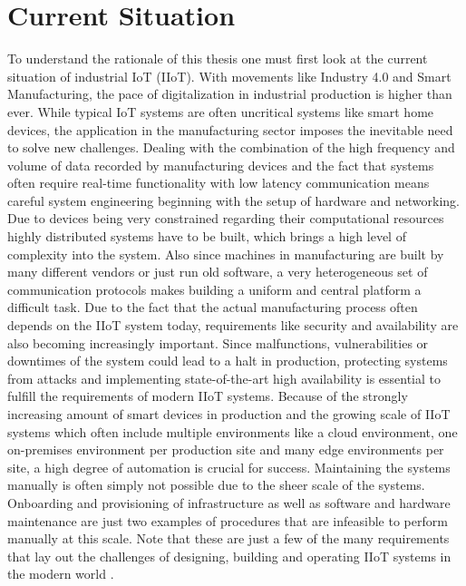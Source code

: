 \section{Current Situation}
\label{section:current-situation}
    To understand the rationale of this thesis one must first look at the current situation of industrial IoT (IIoT). With movements like Industry 4.0 and Smart Manufacturing, the pace of digitalization in industrial production is higher than ever. While typical IoT systems are often uncritical systems like smart home devices, the application in the manufacturing sector imposes the inevitable need to solve new challenges. Dealing with the combination of the high frequency and volume of data recorded by manufacturing devices and the fact that systems often require real-time functionality with low latency communication means careful system engineering beginning with the setup of hardware and networking. Due to devices being very constrained regarding their computational resources highly distributed systems have to be built, which brings a high level of complexity into the system. Also since machines in manufacturing are built by many different vendors or just run old software, a very heterogeneous set of communication protocols makes building a uniform and central platform a difficult task. Due to the fact that the actual manufacturing process often depends on the IIoT system today, requirements like security and availability are also becoming increasingly important. Since malfunctions, vulnerabilities or downtimes of the system could lead to a halt in production, protecting systems from attacks and implementing state-of-the-art high availability is essential to fulfill the requirements of modern IIoT systems. Because of the strongly increasing amount of smart devices in production and the growing scale of IIoT systems which often include multiple environments like a cloud environment, one on-premises environment per production site and many edge environments per site, a high degree of automation is crucial for success. Maintaining the systems manually is often simply not possible due to the sheer scale of the systems. Onboarding and provisioning of infrastructure as well as software and hardware maintenance are just two examples of procedures that are infeasible to perform manually at this scale. Note that these are just a few of the many requirements that lay out the challenges of designing, building and operating IIoT systems in the modern world \cite{fraunhofer_whitepaper}.\newline

